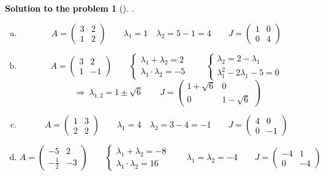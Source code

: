 \documentclass[12pt,a4]{article}
\newtheorem{solution}{Solution to the problem}
\newcommand{\bv}{{\mathbf v}}
\begin{document}
\textcolor{black}{
\begin{solution}[]\rm .
\begin{enumerate}[(a)]
	\item
\[
A = 
\begin{pmatrix}
3 & 2 \\ 1 & 2
\end{pmatrix}
\qquad
\lambda_1 = 1
\quad
\lambda_2 = 5-1=4
\qquad
J =
\begin{pmatrix}
1 & 0 \\ 0 & 4
\end{pmatrix}
\]
	\item
\[
A = 
\begin{pmatrix}
3 & 2 \\ 1 & -1
\end{pmatrix}
\qquad
\left \{ \begin{matrix}
\lambda_1 + \lambda_2 = 2 \\
\lambda_1 \cdot \lambda_2 = -5
\end{matrix} \right .
\qquad
\left \{ \begin{matrix}
\lambda_2 = 2 - \lambda_1\\
\lambda_1^2-2\lambda_1 -5 = 0
\end{matrix} \right .
\]
\[
~\Rightarrow~
\lambda_{1,2} = 1 \pm \sqrt{6}
\qquad
J =
\begin{pmatrix}
1 + \sqrt6 & 0 \\ 0 & 1 - \sqrt6
\end{pmatrix}
\]
	\item
\[
A =
\begin{pmatrix}
1 & 3 \\ 2 & 2
\end{pmatrix}
\qquad
\lambda_1 = 4
\quad
\lambda_2 = 3-4=-1
\qquad
J =
\begin{pmatrix}
4 & 0 \\ 0 & -1
\end{pmatrix}
\]
	\item
\[
A =
\begin{pmatrix}
-5 & 2 \\ -\frac12 & -3
\end{pmatrix}
\qquad
\left \{ \begin{matrix}
\lambda_1 + \lambda_2 = -8 \\
\lambda_1 \cdot \lambda_2 = 16
\end{matrix} \right .
\qquad
\lambda_1 = \lambda_2 = -4
\qquad
J =
\begin{pmatrix}
-4 & 1 \\ 0 & -4
\end{pmatrix}
\]\\
\end{enumerate}
\end{solution}
}
\end{document}
